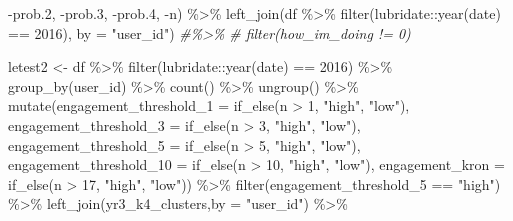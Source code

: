 \documentclass[
]{article}
\newenvironment{Shaded}{\begin{snugshade}}{\end{snugshade}}
\newcommand{\AttributeTok}[1]{\textcolor[rgb]{0.77,0.63,0.00}{#1}}
\newcommand{\CommentTok}[1]{\textcolor[rgb]{0.56,0.35,0.01}{\textit{#1}}}
\newcommand{\DecValTok}[1]{\textcolor[rgb]{0.00,0.00,0.81}{#1}}
\newcommand{\FloatTok}[1]{\textcolor[rgb]{0.00,0.00,0.81}{#1}}
\newcommand{\FunctionTok}[1]{\textcolor[rgb]{0.00,0.00,0.00}{#1}}
\newcommand{\NormalTok}[1]{#1}
\newcommand{\OtherTok}[1]{\textcolor[rgb]{0.56,0.35,0.01}{#1}}
\newcommand{\SpecialCharTok}[1]{\textcolor[rgb]{0.00,0.00,0.00}{#1}}
\newcommand{\StringTok}[1]{\textcolor[rgb]{0.31,0.60,0.02}{#1}}
\begin{document}
\begin{Shaded}
\begin{Highlighting}[]
          \SpecialCharTok{{-}}\NormalTok{prob}\FloatTok{.2}\NormalTok{,}
          \SpecialCharTok{{-}}\NormalTok{prob}\FloatTok{.3}\NormalTok{,}
          \SpecialCharTok{{-}}\NormalTok{prob}\FloatTok{.4}\NormalTok{,}
          \SpecialCharTok{{-}}\NormalTok{n) }\SpecialCharTok{\%\textgreater{}\%} 
  \FunctionTok{left\_join}\NormalTok{(df }\SpecialCharTok{\%\textgreater{}\%}
  \FunctionTok{filter}\NormalTok{(lubridate}\SpecialCharTok{::}\FunctionTok{year}\NormalTok{(date) }\SpecialCharTok{==} \DecValTok{2016}\NormalTok{),}
         \AttributeTok{by =} \StringTok{"user\_id"}\NormalTok{)}
\CommentTok{\#\%\textgreater{}\%}
\CommentTok{\#  filter(how\_im\_doing != 0)}


\NormalTok{letest2 }\OtherTok{\textless{}{-}}\NormalTok{  df }\SpecialCharTok{\%\textgreater{}\%}
  \FunctionTok{filter}\NormalTok{(lubridate}\SpecialCharTok{::}\FunctionTok{year}\NormalTok{(date) }\SpecialCharTok{==} \DecValTok{2016}\NormalTok{) }\SpecialCharTok{\%\textgreater{}\%}
  \FunctionTok{group\_by}\NormalTok{(user\_id) }\SpecialCharTok{\%\textgreater{}\%}
  \FunctionTok{count}\NormalTok{() }\SpecialCharTok{\%\textgreater{}\%}
  \FunctionTok{ungroup}\NormalTok{() }\SpecialCharTok{\%\textgreater{}\%} 
  \FunctionTok{mutate}\NormalTok{(}\AttributeTok{engagement\_threshold\_1 =} \FunctionTok{if\_else}\NormalTok{(n }\SpecialCharTok{\textgreater{}} \DecValTok{1}\NormalTok{, }\StringTok{"high"}\NormalTok{, }\StringTok{"low"}\NormalTok{),}
         \AttributeTok{engagement\_threshold\_3 =} \FunctionTok{if\_else}\NormalTok{(n }\SpecialCharTok{\textgreater{}} \DecValTok{3}\NormalTok{, }\StringTok{"high"}\NormalTok{, }\StringTok{"low"}\NormalTok{),}
         \AttributeTok{engagement\_threshold\_5 =} \FunctionTok{if\_else}\NormalTok{(n }\SpecialCharTok{\textgreater{}} \DecValTok{5}\NormalTok{, }\StringTok{"high"}\NormalTok{, }\StringTok{"low"}\NormalTok{),}
         \AttributeTok{engagement\_threshold\_10 =} \FunctionTok{if\_else}\NormalTok{(n }\SpecialCharTok{\textgreater{}} \DecValTok{10}\NormalTok{, }\StringTok{"high"}\NormalTok{, }\StringTok{"low"}\NormalTok{),}
         \AttributeTok{engagement\_kron =} \FunctionTok{if\_else}\NormalTok{(n }\SpecialCharTok{\textgreater{}} \DecValTok{17}\NormalTok{, }\StringTok{"high"}\NormalTok{, }\StringTok{"low"}\NormalTok{)) }\SpecialCharTok{\%\textgreater{}\%} 
  \FunctionTok{filter}\NormalTok{(engagement\_threshold\_5 }\SpecialCharTok{==} \StringTok{"high"}\NormalTok{) }\SpecialCharTok{\%\textgreater{}\%} 
  \FunctionTok{left\_join}\NormalTok{(yr3\_k4\_clusters,}\AttributeTok{by =} \StringTok{"user\_id"}\NormalTok{) }\SpecialCharTok{\%\textgreater{}\%} 

\end{Highlighting}
\end{Shaded}
\end{document}
